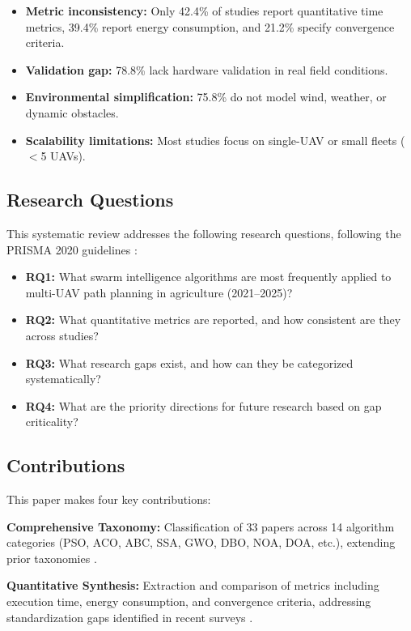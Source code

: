 \documentclass[review, 12pt, times]{elsarticle}
\begin{document}
\begin{itemize}
  \item \textbf{Metric inconsistency:} Only 42.4\% of
  studies report quantitative time metrics, 39.4\% report
  energy consumption, and 21.2\% specify convergence criteria.
  \item \textbf{Validation gap:} 78.8\% lack hardware
  validation in real field conditions.
  \item \textbf{Environmental simplification:} 75.8\% do
  not model wind, weather, or dynamic obstacles.
  \item \textbf{Scalability limitations:} Most studies focus
  on single-UAV or small fleets ($<$5 UAVs).
\end{itemize}

\subsection{Research Questions}

This systematic review addresses the following research
questions, following the PRISMA 2020 guidelines
\cite{page2021}:

\begin{itemize}
  \item \textbf{RQ1:} What swarm intelligence algorithms are
  most frequently applied to multi-UAV path planning in
  agriculture (2021--2025)?
  \item \textbf{RQ2:} What quantitative metrics are reported,
  and how consistent are they across studies?
  \item \textbf{RQ3:} What research gaps exist, and how can
  they be categorized systematically?
  \item \textbf{RQ4:} What are the priority directions for
  future research based on gap criticality?
\end{itemize}

\subsection{Contributions}

This paper makes four key contributions:

\textbf{Comprehensive Taxonomy:} Classification of 33 papers
across 14 algorithm categories (PSO, ACO, ABC, SSA, GWO,
DBO, NOA, DOA, etc.), extending prior taxonomies
\cite{chung2018,brambilla2013,puente2022,sharma2022}.

\textbf{Quantitative Synthesis:} Extraction and comparison
of metrics including execution time, energy consumption, and
convergence criteria, addressing standardization gaps
identified in recent surveys
\cite{phung2021,pan2022,aitsaadi2022}.
\end{document}

